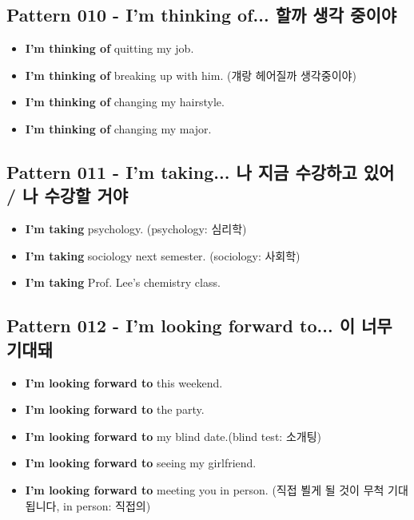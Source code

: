 \documentclass[11pt]{oblivoir}
\begin{document}
\subsection{Pattern 010 - I'm thinking of... \texttildelow 할까 생각 중이야}
\begin{itemize}
  \item \textbf{I'm thinking of} quitting my job.
  \item \textbf{I'm thinking of} breaking up with him. (걔랑 헤어질까 생각중이야)
  \item \textbf{I'm thinking of} changing my hairstyle.
  \item \textbf{I'm thinking of} changing my major.
\end{itemize}

\subsection{Pattern 011 - I'm taking... 나 지금 \texttildelow 수강하고 있어 / 나 \texttildelow 수강할 거야}
\begin{itemize}
  \item \textbf{I'm taking} psychology. (psychology: 심리학)
  \item \textbf{I'm taking} sociology next semester. (sociology: 사회학)
  \item \textbf{I'm taking} Prof. Lee's chemistry class.
\end{itemize}

\subsection{Pattern 012 - I'm looking forward to... \texttildelow 이 너무 기대돼}
\begin{itemize}
  \item \textbf{I'm looking forward to} this weekend.
  \item \textbf{I'm looking forward to} the party.
  \item \textbf{I'm looking forward to} my blind date.(blind test: 소개팅)
  \item \textbf{I'm looking forward to} seeing my girlfriend.
  \item \textbf{I'm looking forward to} meeting you in person. (직접 뵐게 될 것이 무척 기대됩니다, in person: 직접의)
\end{itemize}
\end{document}
